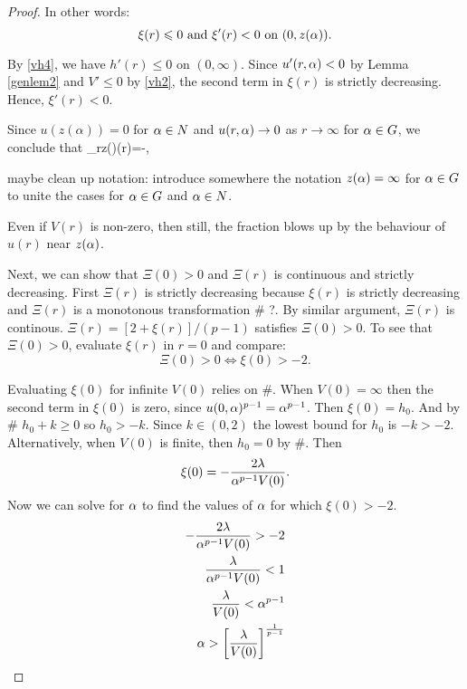 \begin{proof}
{In other words: 
$$\xi(r)\leqslant0\text{ and }\xi'(r)<0\text{ on }(0,z(\alpha)).$$ 
}

By \eqref{vh4}, we have $h'(r) \leq 0$ on $(0, \infty)$. Since $u'(r, \alpha) < 0$
by Lemma \ref{genlem2} and $V' \leq 0$ by \eqref{vh2}, the second term in
$\xi(r)$ is strictly decreasing. Hence, $\xi'(r) < 0$. 

% 

Since $u(z(\alpha))=0$ for $\alpha \in N$ and $u(r, \alpha) \to 0$ as $r \to \infty$ for
$\alpha \in G$, we conclude that 
\be \label{xilim}
    \lim_{r\to z(\alpha)}\xi(r)=-\infty,
\ee

{\red maybe clean up notation: introduce somewhere the notation $z(\alpha) = \infty$
for $\alpha \in G$ to unite the cases for $\alpha \in G$ and $\alpha \in N$.}

\revgroup Even if $V(r)$ is non-zero, then still, the fraction blows up by the behaviour
of $u(r)$ near $z(\alpha)$.

Next, we can show that $\Xi(0)>0$ and $\Xi(r)$ is continuous and strictly
decreasing. First $\Xi(r)$ is strictly decreasing because $\xi(r)$ is strictly
decreasing and $\Xi(r)$ is a monotonous transformation \# ?. By similar
argument, $\Xi(r)$ is continous. $\Xi(r)=\left[2+\xi(r)\right]/(p-1)$ satisfies
$\Xi(0)>0$. To see that $\Xi(0)>0$, evaluate $\xi(r)$ in $r=0$ and compare:
$$\Xi(0)>0\iff\xi(0)>-2.$$

Evaluating $\xi(0)$ for infinite $V(0)$ relies on \#. When $V(0)=\infty$ then
the second term in $\xi(0)$ is zero, since $u(0,\alpha)^{p-1}=\alpha^{p-1}$. Then
$\xi(0)=h_0$. And by \# $h_0+k\geq0$ so $h_0>-k$. Since $k\in(0,2)$ the lowest
bound for $h_0$ is $-k>-2$. Alternatively, when $V(0)$ is finite, then $h_0=0$
by \#. Then $$\xi(0)=-\frac{2\lambda}{\alpha^{p-1}V(0)}.$$ Now we can solve for $\alpha$
to find the values of $\alpha$ for which $\xi(0)>-2$.  
\begin{align*}
-\frac{2\lambda}{\alpha^{p-1}V(0)}>-2\\ \frac{\lambda}{\alpha^{p-1}V(0)}<1\\
\frac{\lambda}{V(0)}<\alpha^{p-1}\\ 
\alpha > \left[\frac{\lambda}{V(0)}\right]^{\frac{1}{p-1}} 
\end{align*} 


\end{proof}
